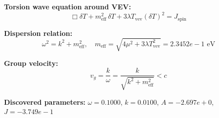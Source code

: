 
\textbf{Torsion wave equation around VEV:}
\begin{equation}
  \Box \delta T + m_{\text{eff}}^2 \, \delta T + 3\lambda T_{\text{vev}} (\delta T)^2 = J_{\text{spin}}
\end{equation}

\textbf{Dispersion relation:}
\begin{equation}
  \omega^2 = k^2 + m_{\text{eff}}^2, \quad
  m_{\text{eff}} = \sqrt{4\mu^2 + 3\lambda T_{\text{vev}}^2} = 2.3452e-1 \text{ eV}
\end{equation}

\textbf{Group velocity:}
\begin{equation}
  v_g = \frac{k}{\omega} = \frac{k}{\sqrt{k^2 + m_{\text{eff}}^2}} < c
\end{equation}

\textbf{Discovered parameters:}
$\omega = 0.1000$, \quad
$k = 0.0100$, \quad
$A = -2.697e+0$, \quad
$J = -3.749e-1$